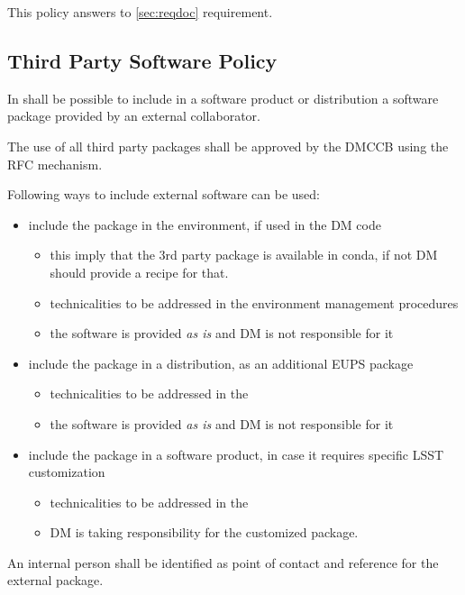 This policy answers to \ref{sec:reqdoc} requirement.


\subsection{Third Party Software Policy} \label{sec:thirdpolicy}

In shall be possible to include in a software product or distribution a software package provided by an external collaborator.

The use of all third party packages shall be approved by the DMCCB using the RFC mechanism.

Following ways to include external software can be used:

\begin{itemize}
\item include the package in the environment, if used in the DM code
    \begin{itemize}
    \item this imply that the 3rd party package is available in conda, if not DM should provide a recipe for that.
    \item technicalities to be addressed in the environment management procedures
    \item the software is provided \textit{as is} and DM is not responsible for it
    \end{itemize}
\item include the package in a distribution, as an additional EUPS package 
    \begin{itemize}
    \item technicalities to be addressed in the 
    \item the software is provided \textit{as is} and DM is not responsible for it
    \end{itemize}
\item include the package in a software product, in case it requires specific LSST customization
    \begin{itemize}
    \item technicalities to be addressed in the 
    \item DM is taking responsibility for the customized package.
    \end{itemize}
\end{itemize}

An internal person shall be identified as point of contact and reference for the external package.

